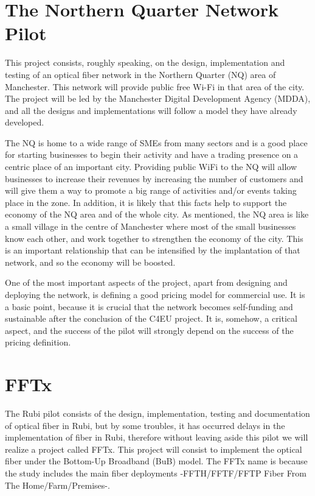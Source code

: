 \documentclass[draftclsnofoot,12pt,journal,onecolumn]{IEEEtran}
\begin{document}
\section{The Northern Quarter Network Pilot}
This project consists, roughly speaking, on the design, implementation and testing of an optical fiber network in the Northern Quarter (NQ) area of Manchester. This network will provide public free Wi-Fi in that area of the city. The project will be led by the Manchester Digital Development Agency (MDDA), and all the designs and implementations will follow a model they have already developed.


The NQ is home to a wide range of SMEs from many sectors and is a good place for starting businesses to begin their activity and have a trading presence on a centric place of an important city. Providing public WiFi to the NQ will allow businesses to increase their revenues by increasing the number of customers and will give them a way to promote a big range of activities and/or events taking place in the zone. In addition, it is likely that this facts help to support the economy of the NQ area and of the whole city. As mentioned, the NQ area is like a small village in the centre of Manchester where most of the small businesses know each other, and work together to strengthen the economy of the city. This is an important relationship that can be intensified by the implantation of that network, and so the economy will be boosted.



One of the most important aspects of the project, apart from designing and deploying the network, is defining a good pricing model for commercial use. It is a basic point, because it is crucial that the network becomes self-funding and sustainable after the conclusion of the C4EU project. It is, somehow, a critical aspect, and the success of the pilot will strongly depend on the success of the pricing definition. 

\section{FFTx}
The Rubi pilot consists of the design, implementation, testing and documentation of optical fiber in Rubi, but by some troubles, it has occurred delays in the implementation of fiber in Rubi, therefore without leaving aside this pilot we will realize a project called FFTx. This project will consist to implement the optical fiber under the Bottom-Up Broadband (BuB) model. The FFTx name is because the study includes the main fiber deployments -FFTH/FFTF/FFTP Fiber From The Home/Farm/Premises-. 
\end{document}
